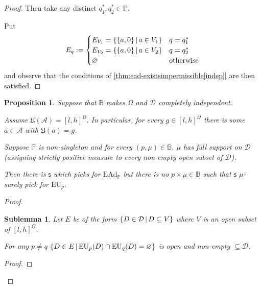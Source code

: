 \documentclass[a4paper]{article}
\newtheorem{proposition}[theorem]{Proposition}
\newtheorem{sublemma}{Sublemma}[theorem]
\newcommand\A{\mathcal{A}}
\renewcommand\P{\mathbb{P}} %
\newcommand\Exp{\mathsf{Exp}}
\newcommand\EU{\mathrm{EU}}
\newcommand\EAd{\mathrm{EAd}}
\newcommand\U{\mathfrak{U}} %
\newcommand{\D}{\mathcal{D}}
\newcommand{\Decs}{\mathcal{D}}
\newcommand\s{\mathsf{s}}
\newcommand{\IB}{\mathbb{B}}
\newcommand{\IP}{\P}
\renewcommand{\color}[1]{}
\newenvironment{colored}[1]{\leavevmode\color{#1}}{}
\newcommand\SetDelimiter[1][]{
	\nonscript\,#1\vert \allowbreak \nonscript\,\mathopen{}}
\providecommand\given{\SetDelimiter}
\renewcommand{\emptyset}{\varnothing}
\newenvironment{CCM rewritten}
{\begingroup\color{blue}} %
{\endgroup}              %
\begin{document}
\begin{colored}{violet}
\begin{proof}
Then take any distinct $q^*_1,q^*_2\in\IP$. 

Put $$E_q:=\begin{cases}
	E_{V_1}=\{\{a,0\}\given a\in V_1\}&q=q^*_1\\
	E_{V_2}=\{\{a,0\}\given a\in V_2\}&q=q^*_2\\
	\emptyset&\text{otherwise}
\end{cases}$$
and observe that the conditions of \cref{thm:ead-existsimpermissible[indep]} are then satisfied. 
\end{proof}


\begin{proposition}\label{thm:ead-existsimpermissible[dep]:spreadeg}Suppose that $\IB$ makes $\Omega$ and $\Decs$ completely independent. 
	
	Assume $\U(\A)=[l,h]^\Omega$. In particular, for every $g\in [l,h]^\Omega$ there is some $a\in \A$ with $\U(a)=g$. 
	
	Suppose $\IP$ is non-singleton and for every $(p,\mu)\in\IB$, $\mu$ has full support on $\Decs$ (assigning strictly positive measure to every non-empty open subset of $\Decs$).
	
	Then there is $\s$ which picks for $\EAd_\IP$ but there is no $p\times\mu\in \IB$ such that $\s$ $\mu$-surely pick for $\EU_p$.
	
\end{proposition}
\begin{proof}
	\begin{sublemma}
		Let $E$ be of the form $\{D\in\D\given D\subseteq V\}$ where $V$ is an open subset of $[l,h]^\Omega$.
		
		For any $p\neq q$
		$\{D\in E\given \EU_{p}(D)\cap \EU_{q}(D)=\emptyset\}$ is open and non-empty $\subseteq\Decs$.
	\end{sublemma}
	\begin{proof}
		
		

\end{proof}
\end{proof}
\end{colored}
\end{document}
